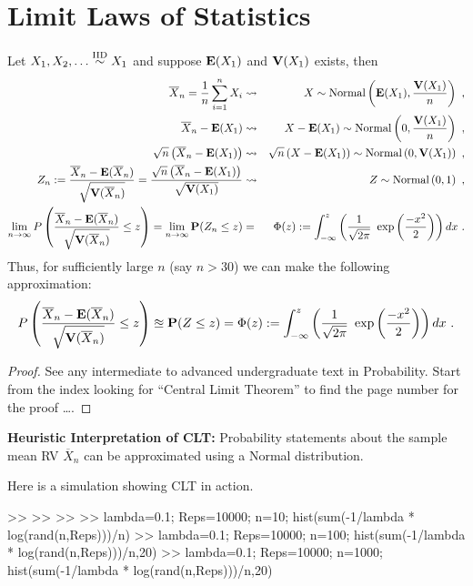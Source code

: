 

\chapter{Limit Laws of Statistics}\label{S:LimitLawsStats}

\begin{prop}
Let $X_1,X_2,\ldots \overset{{\rm IID}}{\sim} X_1$ and suppose $\mathbf{E}(X_1)$ and $\mathbf{V}(X_1)$ exists, then 
{\small
\begin{eqnarray}
\overline{X}_n = \frac{1}{n} \sum_{i=1}^n X_i 
& \rightsquigarrow & 
X \sim \mbox{{\rm Normal}} \left( \mathbf{E}(X_1),\frac{\mathbf{V}(X_1)}{n}  \right) \ , \\
\overline{X}_n -\mathbf{E}(X_1) 
& \rightsquigarrow & 
X-\mathbf{E}(X_1) \sim \mbox{{\rm Normal}} \left( 0,\frac{\mathbf{V}(X_1)}{n}  \right) \ , \\
\sqrt{n} \left( \overline{X}_n -\mathbf{E}(X_1) \right)
& \rightsquigarrow & 
\sqrt{n} \left( X-\mathbf{E}(X_1) \right) \sim \mbox{{\rm Normal}} \left( 0,\mathbf{V}(X_1)  \right) \ , \\
Z_n :=  \frac{\overline{X}_n-\mathbf{E}(\overline{X}_n)}{\sqrt{\mathbf{V}(\overline{X}_n)}} 
= \frac{\sqrt{n} \left( \overline{X}_n -\mathbf{E}(X_1) \right)}{\sqrt{\mathbf{V}(X_1)}}
& \rightsquigarrow & 
Z  \sim \mbox{{\rm Normal}} \left( 0,1  \right) \ , \\
\lim_{n \to \infty} P\left( \frac{\overline{X}_n-\mathbf{E}(\overline{X}_n)}{\sqrt{\mathbf{V}(\overline{X}_n)}}  \leq z \right)
= \lim_{n \to \infty} \mathbf{P}(Z_n \leq z)
&=&
\Phi(z) := \int_{- \infty}^z \left( \frac{1}{\sqrt{2 \pi}} \ \exp \left( \frac{-x^2}{2} \right) \right) dx \ .
\end{eqnarray}
}
Thus, for sufficiently large $n$ (say $n>30$) we can make the following approximation:
\begin{equation}\label{E:CLTApprox}
P\left( \frac{\overline{X}_n-\mathbf{E}(\overline{X}_n)}{\sqrt{\mathbf{V}(\overline{X}_n)}}  \leq z \right) 
\approxeq 
\mathbf{P}(Z \leq z)
=
\Phi(z) := \int_{- \infty}^z \left( \frac{1}{\sqrt{2 \pi}} \ \exp \left( \frac{-x^2}{2} \right) \right) dx \ .
\end{equation}
{\scriptsize
\begin{proof}
See any intermediate to advanced undergraduate text in Probability.  Start from the index looking for ``Central Limit Theorem'' to find the page number for the proof \ldots .
\end{proof}
}
{\bf Heuristic Interpretation of CLT:}  Probability statements about the sample mean RV $\overline{X}_n$ can be approximated using a Normal distribution. 
\end{prop}
Here is a simulation showing CLT in action.
\begin{VrbM}
>> %
>> %
>> %
>> lambda=0.1; Reps=10000; n=10; hist(sum(-1/lambda * log(rand(n,Reps)))/n)
>> lambda=0.1; Reps=10000; n=100; hist(sum(-1/lambda * log(rand(n,Reps)))/n,20)
>> lambda=0.1; Reps=10000; n=1000; hist(sum(-1/lambda * log(rand(n,Reps)))/n,20)
\end{VrbM}

